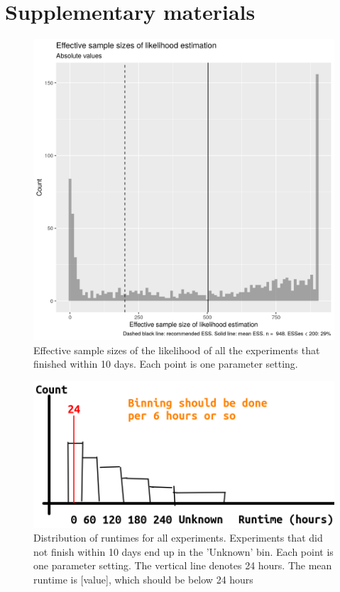 \section{Supplementary materials}

\begin{figure}[!htbp]
  \includegraphics[width=\textwidth]{20190905_fig_esses.png}
  \caption{
    Effective sample sizes of the likelihood of all the experiments that
    finished within 10 days. 
    Each point is one parameter setting.
  }
  \label{fig:esses}
\end{figure}

\begin{figure}[!htbp]
  \includegraphics[width=\textwidth]{fig_runtimes.png}
  \caption{
    Distribution of runtimes for all experiments.
    Experiments that did not finish within 10 days end up
    in the 'Unknown' bin.
    Each point is one parameter setting.
    The vertical line denotes 24 hours. The mean runtime is
    [value], which should be below 24 hours 
  }
  \label{fig:runtimes}
\end{figure}


